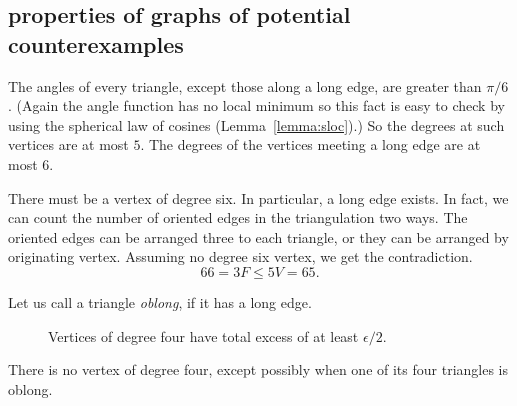 \subsection{properties of  graphs of potential counterexamples}


The angles of every triangle, except those along a long edge, are
greater than $\pi/6$. (Again the angle function has no local
minimum so this fact is easy to check by using the spherical law of cosines (Lemma~\ref{lemma:sloc}).) So
the degrees at such vertices are at most $5$.  The degrees of the
vertices meeting a long edge are at most $6$.



There must be a vertex of degree six.  In particular, a long edge
exists.  In fact, we can count the number of oriented edges in the
triangulation two ways.  The oriented edges can be arranged three
to each triangle, or they can be arranged by originating vertex.
Assuming no degree six vertex, we get the contradiction.
    $$66 = 3 F \le 5 V = 65.$$

Let us call a triangle {\it oblong}, if it has a long edge.

\begin{figure}[htb]
  \centering
  \caption{Vertices of degree four have total
excess of at least $\epsilon/2$.}
  \label{fig:13:C}
\end{figure}

\begin{lemma}  There is no vertex of degree four, except possibly
when one of its four triangles is oblong.
\end{lemma}

